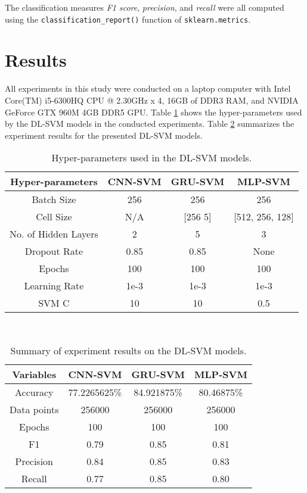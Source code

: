 \documentclass[sigconf]{acmart}
\begin{document}
The classification measures \textit{F1 score}, \textit{precision}, and \textit{recall} were all computed using the \texttt{classification\_report()} function of \texttt{sklearn.metrics}\cite{scikit-learn}.

\section{Results}
All experiments in this study were conducted on a laptop computer with Intel Core(TM) i5-6300HQ CPU @ 2.30GHz x 4, 16GB of DDR3 RAM, and NVIDIA GeForce GTX 960M 4GB DDR5 GPU. Table \ref{table: hyper-parameters} shows the hyper-parameters used by the DL-SVM models in the conducted experiments. Table \ref{table: summary-results} summarizes the experiment results for the presented DL-SVM models.
\begin{table}[htb!]
\centering
\caption{Hyper-parameters used in the DL-SVM models.}
		\begin{tabular}{cccc}
		\toprule
		Hyper-parameters & CNN-SVM & GRU-SVM & MLP-SVM \\
		\midrule
		Batch Size & 256 & 256 & 256 \\
		Cell Size & N/A & [256  5] & [512, 256, 128] \\
		No. of Hidden Layers & 2 & 5 & 3 \\
		Dropout Rate & 0.85 & 0.85 & None \\
		Epochs & 100 & 100 & 100 \\
		Learning Rate & 1e-3 & 1e-3 & 1e-3 \\
		SVM C & 10 & 10 & 0.5 \\
		\bottomrule
		\end{tabular}\\
		\label{table: hyper-parameters}
\end{table}

\begin{table}
\centering
\caption{Summary of experiment results on the DL-SVM models.}
		\begin{tabular}{cccc}
		\toprule
		Variables & CNN-SVM & GRU-SVM & MLP-SVM \\
		\midrule
		Accuracy & 77.2265625\% & 84.921875\% & 80.46875\% \\
		Data points  & 256000 & 256000 & 256000 \\
		Epochs & 100 & 100 & 100 \\
		F1 & 0.79 & 0.85 & 0.81 \\
		Precision & 0.84 & 0.85 & 0.83 \\
		Recall & 0.77 & 0.85 & 0.80 \\ 
		\bottomrule
		\end{tabular}\\
		\label{table: summary-results}
\end{table}
\end{document}
